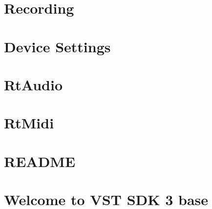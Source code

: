 \let\mypdfximage\pdfximage\def\pdfximage{\immediate\mypdfximage}\documentclass[twoside]{book}
\newcommand{\+}{\discretionary{\mbox{\scriptsize$\hookleftarrow$}}{}{}}
\begin{document}
\chapter{Recording}
\label{recording}

\chapter{Device Settings}
\label{settings}

\chapter{Rt\+Audio}
\label{md__c_1__users_fab_src__github_branches__neural_amp_modeler_plugin_i_plug2__dependencies__i_plug__r_t_audio__r_e_a_d_m_e}

\chapter{Rt\+Midi}
\label{md__c_1__users_fab_src__github_branches__neural_amp_modeler_plugin_i_plug2__dependencies__i_plug__r_t_midi__r_e_a_d_m_e}

\chapter{R\+E\+A\+D\+ME}
\label{md__c_1__users_fab_src__github_branches__neural_amp_modeler_plugin_i_plug2__dependencies__i_plug__v_s_t2__s_d_k__r_e_a_d_m_e}

\chapter{Welcome to V\+ST S\+DK 3 base}
\label{md__c_1__users_fab_src__github_branches__neural_amp_modeler_plugin_i_plug2__dependencies__i_plugc1a511ecd5a830f6f10d7d505e2c8756}

\end{document}
